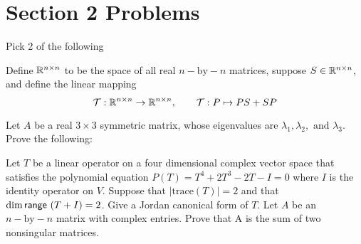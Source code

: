 \documentclass[answers]{exam}
\begin{document}
\section*{Section 2 Problems}
Pick 2 of the following \\
\begin{questions}
\setcounter{question}{4}
    \question Define $\mathbb{R}^{n\times n}$ to be the space of all real $n-\text{by}-n$ matrices, suppose $S\in\mathbb{R}^{n\times n}$,
    and define the linear mapping
    \[
        \mathcal{T}:\mathbb{R}^{n\times n}\rightarrow\mathbb{R}^{n\times n}, \qquad \mathcal{T}:P\mapsto PS + SP
    \]
    \question Let $A$ be a real $3\times 3$ symmetric matrix, whose eigenvalues are $\lambda_1,\lambda_2, 
    \text{ and } \lambda_3.$ Prove the following:
    \question Let $T$ be a linear operator on a four dimensional complex vector space that satisfies the 
    polynomial equation $P(T) = T^4 + 2T^3 - 2T - I = 0$ where $I$ is the identity operator on $V$. Suppose
    that $\left|\text{trace}\left(T\right)\right| = 2$ and that $\text{dim}\,\mathsf{range}\,\left(T + I\right) = 2$. Give
    a Jordan canonical form of $T$.
    \question Let $A$ be an $n-\text{by}-n$ matrix with complex entries. Prove that A is the sum of two nonsingular matrices. 
\end{questions}
\end{document}
